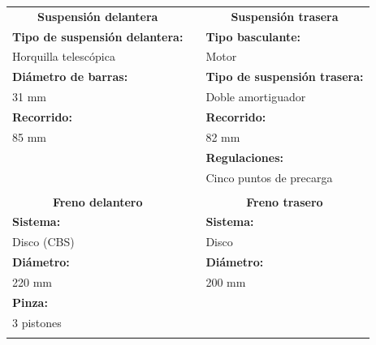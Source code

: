 \begin{table}[H]
\centering
\begin{tabular}{lll}
\multicolumn{1}{c}{\textbf{Suspensión delantera}} &  & \multicolumn{1}{c}{\textbf{Suspensión trasera}} \\ \cline{1-1} \cline{3-3} 
\textbf{Tipo de suspensión delantera:}       &  & \textbf{Tipo basculante:}                       \\
Horquilla telescópica                        &  & Motor                                           \\
\textbf{Diámetro de barras:}                 &  & \textbf{Tipo de suspensión trasera:}            \\
31 mm                                        &  & Doble amortiguador                              \\
\textbf{Recorrido:}                          &  & \textbf{Recorrido:}                             \\
85 mm                                        &  & 82 mm                                           \\
\textbf{}                                    &  & \textbf{Regulaciones:}                          \\
\multicolumn{1}{c}{\textbf{}}                &  & Cinco puntos de precarga                        \\
\textbf{}                                    &  & \textbf{}                                       \\
\multicolumn{1}{c}{\textbf{Freno delantero}} &  & \multicolumn{1}{c}{\textbf{Freno trasero}}      \\ \cline{1-1} \cline{3-3} 
\textbf{Sistema:}                            &  & \textbf{Sistema:}                               \\
Disco (CBS)                                  &  & Disco                                           \\
\textbf{Diámetro:}                           &  & \textbf{Diámetro:}                              \\
220 mm                                       &  & 200 mm                                          \\
\textbf{Pinza:}                              &  & \textbf{}                                       \\
3 pistones                                   &  & \multicolumn{1}{c}{\textbf{}}                   \\
\textbf{}                                    &  & \textbf{}                                       \\

\end{tabular}
\end{table}
